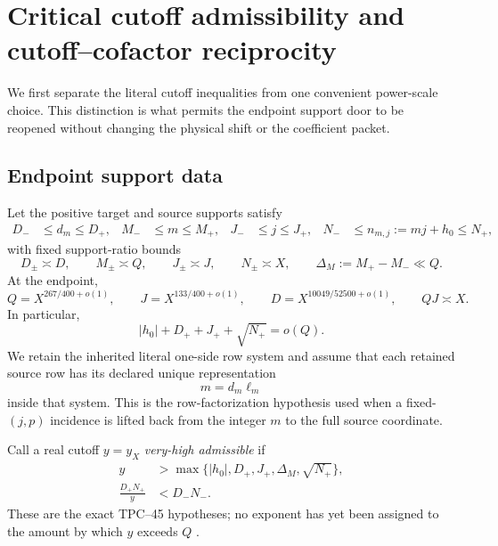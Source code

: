 \section{Critical cutoff admissibility and cutoff--cofactor reciprocity}
\label{sec:tpc59-cutoff}

We first separate the literal cutoff inequalities from one convenient
power-scale choice.  This distinction is what permits the endpoint support
door to be reopened without changing the physical shift or the coefficient
packet.

\subsection{Endpoint support data}

Let the positive target and source supports satisfy
\begin{align}
 D_-&\le d_m\le D_+,&
 M_-&\le m\le M_+,&
 J_-&\le j\le J_+,&
 N_-&\le n_{m,j}:=mj+h_0\le N_+,
 \label{eq:tpc59-support-endpoints}
\end{align}
with fixed support-ratio bounds
\begin{equation}
 D_\pm\asymp D,
 \qquad M_\pm\asymp Q,
 \qquad J_\pm\asymp J,
 \qquad N_\pm\asymp X,
 \qquad \Delta_M:=M_+-M_-\ll Q.
 \label{eq:tpc59-support-ratios}
\end{equation}
At the endpoint,
\begin{equation}
 Q=X^{267/400+o(1)},
 \qquad
 J=X^{133/400+o(1)},
 \qquad
 D=X^{10049/52500+o(1)},
 \qquad QJ\asymp X.
 \label{eq:tpc59-endpoint-QJD}
\end{equation}
In particular,
\begin{equation}
 |h_0|+D_++J_++\sqrt{N_+}=o(Q).
 \label{eq:tpc59-smaller-than-Q}
\end{equation}
We retain the inherited literal one-side row system and assume that each
retained source row has its declared unique representation
\begin{equation}
 m=d_m\ell_m
 \label{eq:tpc59-unique-source-row}
\end{equation}
inside that system.  This is the row-factorization hypothesis used when a
fixed-\((j,p)\) incidence is lifted back from the integer \(m\) to the full
source coordinate.

Call a real cutoff \(y=y_X\) \emph{very-high admissible} if
\begin{align}
 y&>\max\{|h_0|,D_+,J_+,\Delta_M,\sqrt{N_+}\},
 \label{eq:tpc59-admissible-geometric}\\
 \frac{D_+N_+}{y}&<D_-N_-.
 \label{eq:tpc59-admissible-separation}
\end{align}
These are the exact TPC--45 hypotheses; no exponent has yet been assigned to
the amount by which \(y\) exceeds \(Q\) \citep{WangTPC45}.

